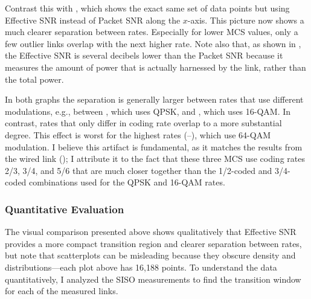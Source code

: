 Contrast this with , which shows the exact same set of data points but using Effective SNR instead of Packet SNR along the $x$-axis. This picture now shows a much clearer separation between rates. Especially for lower MCS values, only a few outlier links overlap with the next higher rate. Note also that, as shown in , the Effective SNR is several decibels lower than the Packet SNR because it measures the amount of power that is actually harnessed by the link, rather than the total power.

In both graphs the separation is generally larger between rates that use different modulations, e.g., between , which uses QPSK, and , which uses 16-QAM. In contrast, rates that only differ in coding rate overlap to a more substantial degree. This effect is worst for the highest rates (--), which use 64-QAM modulation. I believe this artifact is fundamental, as it matches the results from the wired link (); I attribute it to the fact that these three MCS use coding rates 2/3, 3/4, and 5/6 that are much closer together than the 1/2-coded and 3/4-coded combinations used for the QPSK and 16-QAM rates.

\subsubsection{Quantitative Evaluation}
The visual comparison presented above shows qualitatively that Effective SNR provides a more compact transition region and clearer separation between rates, but note that scatterplots can be misleading because they obscure density and distributions---each plot above has 16,188 points. To understand the data quantitatively, I analyzed the SISO measurements to find the transition window for each of the measured links.

